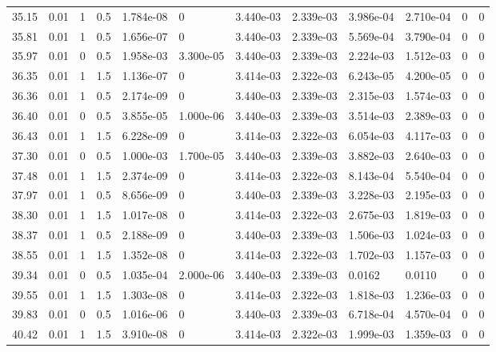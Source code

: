 \documentclass[preview]{standalone}
\begin{document}
{{{{\begin{tabular}{L{1.2cm}C{1.2cm} C{0.3cm}C{0.5cm} C{1.4cm}C{1.4cm} C{1.4cm}C{1.4cm} C{1.6cm}C{1.6cm} C{1.6cm}C{1.6cm}}
  35.15  &  0.01  & 1     & 0.5 &  1.784e-08  & 0  &  3.440e-03&   2.339e-03& 3.986e-04 & 2.710e-04   &  0 & 0  \\ 
  35.81  &  0.01  & 1     & 0.5 &  1.656e-07  & 0  &  3.440e-03&   2.339e-03& 5.569e-04 & 3.790e-04   &  0 & 0  \\ 
  35.97  &  0.01  & 0     & 0.5 &  1.958e-03  & 3.300e-05  &  3.440e-03&   2.339e-03& 2.224e-03 & 1.512e-03   &  0 & 0  \\ 
  36.35  &  0.01  & 1     & 1.5 &  1.136e-07  & 0  &  3.414e-03&   2.322e-03& 6.243e-05 & 4.200e-05   &  0 & 0  \\ 
  36.36  &  0.01  & 1     & 0.5 &  2.174e-09  & 0  &  3.440e-03&   2.339e-03& 2.315e-03 & 1.574e-03   &  0 & 0  \\ 
  36.40  &  0.01  & 0     & 0.5 &  3.855e-05  & 1.000e-06  &  3.440e-03&   2.339e-03& 3.514e-03 & 2.389e-03   &  0 & 0  \\ 
  36.43  &  0.01  & 1     & 1.5 &  6.228e-09  & 0  &  3.414e-03&   2.322e-03& 6.054e-03 & 4.117e-03   &  0 & 0  \\ 
  37.30  &  0.01  & 0     & 0.5 &  1.000e-03  & 1.700e-05  &  3.440e-03&   2.339e-03& 3.882e-03 & 2.640e-03   &  0 & 0  \\ 
  37.48  &  0.01  & 1     & 1.5 &  2.374e-09  & 0  &  3.414e-03&   2.322e-03& 8.143e-04 & 5.540e-04   &  0 & 0  \\ 
  37.97  &  0.01  & 1     & 0.5 &  8.656e-09  & 0  &  3.440e-03&   2.339e-03& 3.228e-03 & 2.195e-03   &  0 & 0  \\ 
  38.30  &  0.01  & 1     & 1.5 &  1.017e-08  & 0  &  3.414e-03&   2.322e-03& 2.675e-03 & 1.819e-03   &  0 & 0  \\ 
  38.37  &  0.01  & 1     & 0.5 &  2.188e-09  & 0  &  3.440e-03&   2.339e-03& 1.506e-03 & 1.024e-03   &  0 & 0  \\ 
  38.55  &  0.01  & 1     & 1.5 &  1.352e-08  & 0  &  3.414e-03&   2.322e-03& 1.702e-03 & 1.157e-03   &  0 & 0  \\ 
  39.34  &  0.01  & 0     & 0.5 &  1.035e-04  & 2.000e-06  &  3.440e-03&   2.339e-03& 0.0162 & 0.0110   &  0 & 0  \\ 
  39.55  &  0.01  & 1     & 1.5 &  1.303e-08  & 0  &  3.414e-03&   2.322e-03& 1.818e-03 & 1.236e-03   &  0 & 0  \\ 
  39.83  &  0.01  & 0     & 0.5 &  1.016e-06  & 0  &  3.440e-03&   2.339e-03& 6.718e-04 & 4.570e-04   &  0 & 0  \\ 
  40.42  &  0.01  & 1     & 1.5 &  3.910e-08  & 0  &  3.414e-03&   2.322e-03& 1.999e-03 & 1.359e-03   &  0 & 0  \\ 

\end{tabular}}}}}
\end{document}
